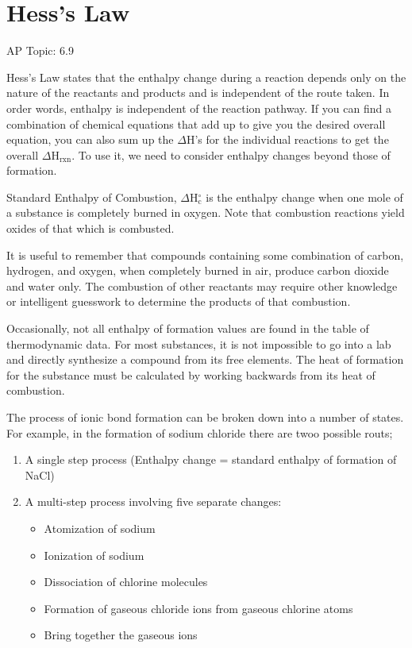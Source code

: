\documentclass[../chem.tex]{subfiles}
\begin{document}
\section{Hess's Law}
AP Topic: 6.9

Hess's Law states that the enthalpy change during a reaction depends only on the nature of the reactants and products and is independent of the route taken.
In order words, enthalpy is independent of the reaction pathway. If you can find a combination of chemical equations that add up to give you the desired overall 
equation, you can also sum up the $\Delta$H's for the individual reactions to get the overall $\Delta$H$_{\text{rxn}}$. To use it, we need to consider enthalpy changes beyond those of formation.

Standard Enthalpy of Combustion, $\Delta$H$_{\text{c}}^{\circ}$ is the enthalpy change when one mole of a substance is completely burned in oxygen. Note that combustion reactions yield
oxides of that which is combusted.

It is useful to remember that compounds containing some combination of carbon, hydrogen, and oxygen, when completely burned in air, produce carbon dioxide and water only. The combustion of other 
reactants may require other knowledge or intelligent guesswork to determine the products of that combustion.

Occasionally, not all enthalpy of formation values are found in the table of thermodynamic data. For most substances, it is not impossible to go into a lab and directly synthesize a compound from its free elements. The heat 
of formation for the substance must be calculated by working backwards from its heat of combustion.

The process of ionic bond formation can be broken down into a number of states. For example, in the formation of sodium chloride there are twoo possible routs;
\begin{enumerate}
    \item A single step process (Enthalpy change = standard enthalpy of formation of NaCl)
    \item A multi-step process involving five separate changes:
        \begin{itemize}
            \item Atomization of sodium
            \item Ionization of sodium 
            \item Dissociation of chlorine molecules 
            \item Formation of gaseous chloride ions from gaseous chlorine atoms 
            \item Bring together the gaseous ions
        \end{itemize}
\end{enumerate}
\end{document}
